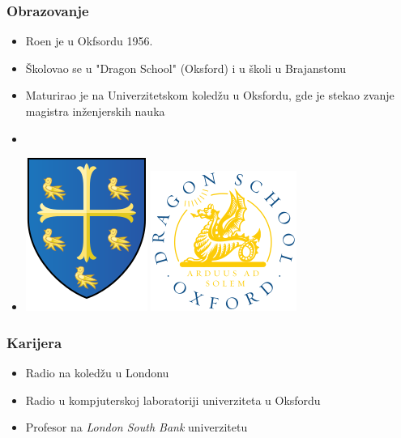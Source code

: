 \documentclass{beamer}
\def\d{{\fontencoding{T1}\selectfont\dj}}
\begin{document}
\begin{frame}

	\frametitle{Obrazovanje}

	\begin{itemize}

		\item Ro{\d}en je u Okfsordu 1956.

		\item Školovao se u "Dragon School" (Oksford) i u školi u Brajanstonu 

		\item Maturirao je na Univerzitetskom koledžu u Oksfordu, gde je stekao zvanje magistra inženjerskih nauka

		\item[]

		\item[] \begin{center} \includegraphics[scale=0.25]{University_College_Oxford_Coat_Of_Arms.png} \hspace{25} \includegraphics[scale=0.3]{Dragon_Coat_Of_Arms.png} \end{center}

	\end{itemize}

\end{frame}


\begin{frame}

\frametitle{Karijera}


    \begin{itemize}

        \item Radio na koledžu u Londonu

        \item Radio u kompjuterskoj laboratoriji univerziteta u Oksfordu

        \item Profesor na \textit{London South Bank} univerzitetu

    \end{itemize}

\end{frame}
\end{document}
